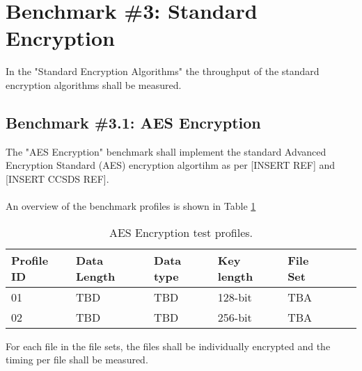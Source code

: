 \section{Benchmark \#3: Standard Encryption}
In the "Standard Encryption Algorithms" the throughput of the standard encryption algorithms shall be measured.

\subsection{Benchmark \#3.1: AES Encryption}
The "AES Encryption" benchmark shall implement the standard Advanced Encryption Standard (AES) encryption algortihm as per [INSERT REF] and [INSERT CCSDS REF].\\
\\
An overview of the benchmark profiles is shown in Table \ref{tab:aes_profiles}\\

\begin{table}[!h]
\centering
\begin{tabular}{|l|l|l|l|l|l|l|}
    \hline
    Profile ID  & Data Length     & Data type   & Key length    & File Set      \\ \hline 
    \hline
    01	        & TBD	          & TBD	        & 128-bit       & TBA           \\ \hline
    02	        & TBD	          & TBD	        & 256-bit       & TBA           \\ \hline
\end{tabular}
\caption{AES Encryption test profiles.}
\label{tab:aes_profiles}
\end{table}

For each file in the file sets, the files shall be individually encrypted and the timing per file shall be measured.